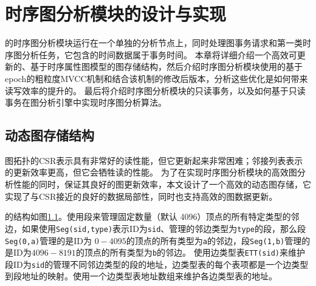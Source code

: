 \chapter{时序图分析模块的设计与实现}
\sys 的时序图分析模块运行在一个单独的分析节点上，同时处理图事务请求和第一类时序图分析任务，它包含的时间数据属于事务时间。
本章将详细介绍一个高效可更新的、基于时序属性图模型的图存储结构\store，然后介绍时序图分析模块使用的基于epoch的粗粒度MVCC机制和\store 结合该机制的修改后版本\newstore，分析这些优化是如何带来读写效率的提升的。
最后将介绍时序图分析模块的只读事务，以及如何基于只读事务在图分析引擎中实现时序图分析算法。

\section{动态图存储结构\store}
图拓扑的CSR表示具有非常好的读性能，但它更新起来非常困难；邻接列表表示的更新效率更高，但它会牺牲读的性能。
为了在实现时序图分析模块的高效图分析性能的同时，保证其良好的图更新效率，本文设计了一个高效的动态图存储\store，它实现了与CSR接近的良好的数据局部性，同时也支持高效的图数据更新。

\begin{figure}[htb]
\label{segcsr}
\end{figure}

\store 的结构如图\ref{segcsr}。\store 使用段来管理固定数量（默认 4096）顶点的所有特定类型的邻边，如果使用\texttt{Seg(sid,type)}表示ID为\texttt{sid}、管理的邻边类型为\texttt{type}的段，那么段\texttt{Seg(0,a)}管理的是ID为 $0-4095$的顶点的所有类型为\texttt{a}的邻边，段\texttt{Seg(1,b)}管理的是ID为$4096-8191$的顶点的所有类型为\texttt{b}的邻边。
\store 使用边类型表\texttt{ETT(sid)}来维护段ID为\texttt{sid}的管理不同邻边类型的段的地址，边类型表的每个表项都是一个边类型到段地址的映射。\store 使用一个边类型表地址数组来维护各边类型表的地址。

